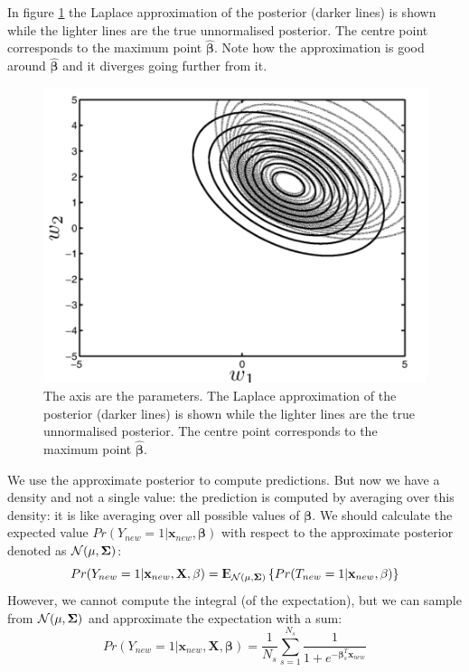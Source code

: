 \documentclass[12pt, letterpaper]{article}
\theoremstyle{definition}
\newcommand{\E}{{\rm I\kern-.3em E}}
\newcommand{\X}{\mathrm{\mathbf{X}}}
\newcommand{\be}{\mathbf{\beta}}
\newcommand{\hbe}{\hat{\mathbf{\beta}}}
\newcommand{\x}{\mathbf{x}}
\begin{document}
In figure \ref{posteriorApprox} the Laplace approximation of the posterior (darker lines) is shown while the lighter lines are the true unnormalised posterior. The centre point corresponds to the maximum point $\hbe$. Note how the approximation is good around $\hbe$ and it diverges going further from it.
\begin{figure}
\centering
\includegraphics[scale=0.4]{img/posteriorApprox}
\caption{The axis are the parameters. The Laplace approximation of the posterior (darker lines) is shown while the lighter lines are the true unnormalised posterior. The centre point corresponds to the maximum point $\hbe$.}
\label{posteriorApprox}
\end{figure}

We use the approximate posterior to compute predictions. But now we have a density and not a single value: the prediction is computed by averaging over this density: it is like averaging over all possible values of $\be$. We should calculate the expected value $Pr(Y_{new} = 1|\x_{new}, \be)$ with respect to the approximate posterior denoted as $\CMcal{N}(\mathbf{\mu, \Sigma})$:
\begin{equation}
Pr(Y_{new}=1|\x_{new}, \X, \be) = \E_{\CMcal{N}(\mathbf{\mu, \Sigma})}\left\lbrace Pr(T_{new}=1| \x_{new}, \be)\right\rbrace
\end{equation}
However, we cannot compute the integral (of the expectation), but we can sample from $\CMcal{N}(\mathbf{\mu, \Sigma})$ and approximate the expectation with a sum:
\begin{equation}
\label{approxDen}
Pr(Y_{new}=1|\x_{new}, \X, \be) = \frac{1}{N_s}\sum_{s=1}^{N_s}\frac{1}{1+e^{-\be_s^T \x_{new}}}
\end{equation}
\end{document}
